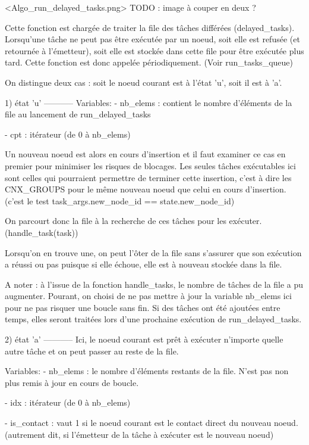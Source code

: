 <Algo_run_delayed_tasks.png> TODO : image à couper en deux ?

Cette fonction est chargée de traiter la file des tâches différées (delayed_tasks). Lorsqu'une tâche
ne peut pas être exécutée par un noeud, soit elle est refusée (et retournée à l'émetteur), soit
elle est stockée dans cette file pour être exécutée plus tard. Cette fonction est donc appelée
périodiquement. (Voir run_tasks_queue)

On distingue deux cas : soit le noeud courant est à l'état 'u', soit il est à 'a'.

1) état 'u'
-----------
Variables:
    - nb_elems : contient le nombre d'éléments de la file au lancement de run_delayed_tasks

    - cpt      : itérateur (de 0 à nb_elems)

Un nouveau noeud est alors en cours d'insertion et il faut examiner ce cas en premier pour minimiser
les risques de blocages.
Les seules tâches exécutables ici sont celles qui pourraient permettre de terminer cette insertion,
c'est à dire les CNX_GROUPS pour le même nouveau noeud que celui en cours d'insertion.
(c'est le test task_args.new_node_id == state.new_node_id)

On parcourt donc la file à la recherche de ces tâches pour les exécuter. (handle_task(task))

Lorsqu'on en trouve une, on peut l'ôter de la file sans s'assurer que son exécution a réussi ou pas
puisque si elle échoue, elle est à nouveau stockée dans la file.

A noter : à l'issue de la fonction handle_tasks, le nombre de tâches de la file a pu augmenter.
Pourant, on choisi de ne pas mettre à jour la variable nb_elems ici pour ne pas risquer une boucle
sans fin. Si des tâches ont été ajoutées entre temps, elles seront traitées lors d'une prochaine
exécution de run_delayed_tasks.

2) état 'a'
-----------
Ici, le noeud courant est prêt à exécuter n'importe quelle autre tâche et on peut passer au reste de
la file.

Variables:
    - nb_elems   :      le nombre d'éléments restants de la file.
                        N'est pas non plus remis à jour en cours de boucle.

    - idx        :      itérateur (de 0 à nb_elems)

    - is_contact :      vaut 1 si le noeud courant est le contact direct du nouveau noeud.
                        (autrement dit, si l'émetteur de la tâche à exécuter est le nouveau noeud)

